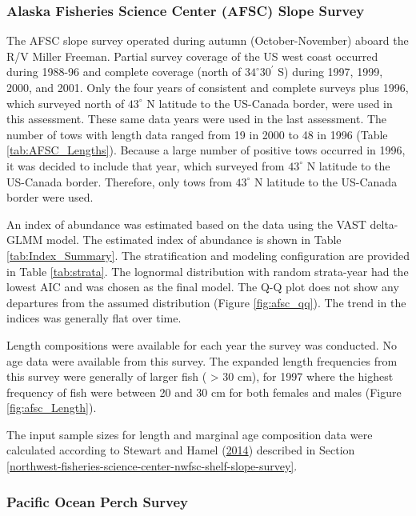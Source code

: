 \documentclass[12pt,]{article}
\begin{document}
\subsubsection{Alaska Fisheries Science Center (AFSC) Slope
Survey}\label{alaska-fisheries-science-center-afsc-slope-survey}

The AFSC slope survey operated during autumn (October-November) aboard
the R/V Miller Freeman. Partial survey coverage of the US west coast
occurred during 1988-96 and complete coverage (north of
\(34^\circ 30^\prime\) S) during 1997, 1999, 2000, and 2001. Only the
four years of consistent and complete surveys plus 1996, which surveyed
north of \(43^\circ\) N latitude to the US-Canada border, were used in
this assessment. These same data years were used in the last assessment.
The number of tows with length data ranged from 19 in 2000 to 48 in 1996
(Table \ref{tab:AFSC_Lengths}). Because a large number of positive tows
occurred in 1996, it was decided to include that year, which surveyed
from \(43^\circ\) N latitude to the US-Canada border. Therefore, only
tows from \(43^\circ\) N latitude to the US-Canada border were used.

An index of abundance was estimated based on the data using the VAST
delta-GLMM model. The estimated index of abundance is shown in Table
\ref{tab:Index_Summary}. The stratification and modeling configuration
are provided in Table \ref{tab:strata}. The lognormal distribution with
random strata-year had the lowest AIC and was chosen as the final model.
The Q-Q plot does not show any departures from the assumed distribution
(Figure \ref{fig:afsc_qq}). The trend in the indices was generally flat
over time.

Length compositions were available for each year the survey was
conducted. No age data were available from this survey. The expanded
length frequencies from this survey were generally of larger fish (
\textgreater{} 30 cm), for 1997 where the highest frequency of fish were
between 20 and 30 cm for both females and males (Figure
\ref{fig:afsc_Length}).

The input sample sizes for length and marginal age composition data were
calculated according to Stewart and Hamel
(\protect\hyperlink{ref-stewart_bootstrapping_2014}{2014}) described in
Section
\ref{northwest-fisheries-science-center-nwfsc-shelf-slope-survey}.

\subsubsection{Pacific Ocean Perch
Survey}\label{pacific-ocean-perch-survey}
\end{document}
